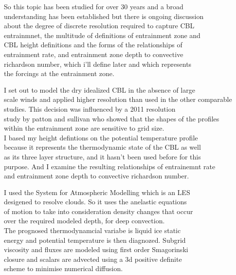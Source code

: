 \documentclass{beamer}
\begin{document}
\begin{frame}
So this topic has been studied for over 30 years and a broad\\
understanding has been established but there is ongoing discussion\\
about the degree of discrete resolution required to capture CBL\\
entrainmnet, the multitude of definitions of entrainment zone and\\
CBL height definitions and the forms of the relationships of\\
entrainment rate, and entrainment zone depth to convective\\
richardson number, which i'll define later and which represents\\
the forcings at the entrainment zone.

\end{frame}


\begin{frame}
I set out to model the dry idealized CBL in the absence of large\\
scale winds and applied higher resolution than used in the 
other comparable studies.  This decision was influenced by a 2011 resolution\\
study by patton and sullivan who showed that the shapes of the profiles\\
within the entrainment zone are sensitive to grid size.\\
I based my height defintions on the potential temperature profile\\
because it represents the thermodynamic state of the CBL as well\\
as its three layer structure, and it hasn't been used before for this\\
purpose.  And I examine the resulting relationships of entrainemnt rate\\
and entrainment zone depth to convective richardson number.  
\end{frame}


\begin{frame}
I used the System for Atmospheric Modelling which is an LES\\
desigened to resolve clouds.  So it uses the anelastic equations\\
of motion to take into consideration density changes that occur\\
over the required modeled depth, for deep convection.\\
The prognosed thermodynamcial variabe is liquid ice static\\
energy and potential temperature is then diagnozed.  Subgrid\\
viscosity and fluxes are modeled using first order Smagorinski\\
closure and scalars are advected using a 3d positive definite\\
scheme to minimise numerical diffusion.\\
\end{frame}
\end{document}
